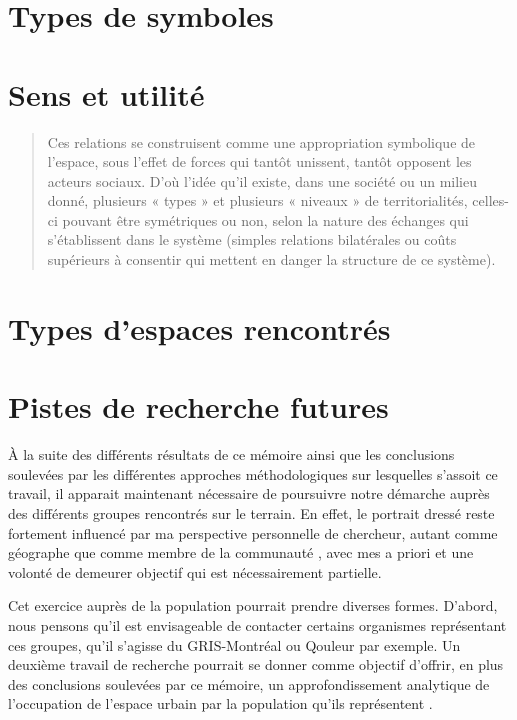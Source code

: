 \section*{Types de symboles}
\label{sec:types_de_symboles}


\section*{Sens et utilité}
\label{sec:sens_et_utilit_}
\begin{quotation}
  Ces relations se construisent comme une appropriation symbolique de l'espace, sous l'effet de forces qui tantôt unissent, tantôt opposent les acteurs sociaux.
  D'où l'idée qu'il existe, dans une société ou un milieu donné, plusieurs « types » et plusieurs « niveaux » de territorialités, celles-ci pouvant être symétriques ou non, selon la nature des échanges qui s'établissent dans le système (simples relations bilatérales ou coûts supérieurs à consentir qui mettent en danger la structure de ce système).\citep[41]{Courville1991}
\end{quotation}

\section*{Types d'espaces rencontrés}
\label{sec:types_d_espaces_rencontr_s}


\section*{Pistes de recherche futures}
\label{sec:pistes_de_recherches}

À la suite des différents résultats de ce mémoire ainsi que les conclusions soulevées par les différentes approches méthodologiques sur lesquelles s'assoit ce travail, il apparait maintenant nécessaire de poursuivre notre démarche auprès des différents groupes rencontrés sur le terrain.
En effet, le portrait dressé reste fortement influencé par ma perspective personnelle de chercheur, autant comme géographe que comme membre de la communauté \lgbt{}, avec mes a priori et une volonté de demeurer objectif qui est nécessairement partielle.

Cet exercice auprès de la population pourrait prendre diverses formes.
D'abord, nous pensons qu'il est envisageable de contacter certains organismes représentant ces groupes, qu'il s'agisse du GRIS-Montréal ou Qouleur par exemple.
Un deuxième travail de recherche pourrait se donner comme objectif d'offrir, en plus des conclusions soulevées par ce mémoire, un approfondissement analytique de l'occupation de l'espace urbain par la population qu'ils représentent .

